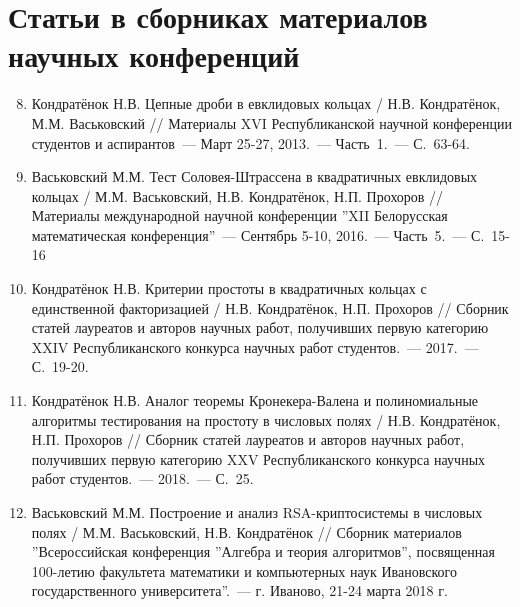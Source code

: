\vspace{-4ex}
\section*{\fontsize{14}{15}\selectfont Статьи в сборниках материалов научных конференций}
\vspace{-4ex}

\begin{enumerate}
\setcounter{enumi}{7}

    \item \label{source:Republican_Scientific_Conference_of_Students_and_Postgraduates_2013}
    Кондратёнок Н.В. Цепные дроби в евклидовых кольцах / Н.В. Кондратёнок, М.М. Васьковский // Материалы XVI Республиканской научной конференции студентов и аспирантов~--- Март 25-27, 2013.~--- Часть~1.~--- С.~63-64.

    \item \label{source:XII_Belarussian_math_conference_2016}
    Васьковский М.М. Тест Соловея-Штрассена в квадратичных евклидовых кольцах / М.М. Васьковский, Н.В. Кондратёнок, Н.П. Прохоров // Материалы международной научной конференции ''XII Белорусская математическая конференция''~--- Сентябрь 5-10, 2016.~--- Часть~5.~--- С.~15-16

    \item \label{source:Collection_of_articles_by_laureates_2017}
    Кондратёнок Н.В. Критерии простоты в квадратичных кольцах с единственной факторизацией / Н.В. Кондратёнок, Н.П. Прохоров // Сборник статей лауреатов и авторов научных работ, получивших первую категорию XXIV Республиканского конкурса научных работ студентов.~--- 2017.~--- С.~19-20.

    \item \label{source:Collection_of_articles_by_laureates_2018}
    Кондратёнок Н.В. Аналог теоремы Кронекера-Валена и полиномиальные алгоритмы тестирования на простоту в числовых полях / Н.В. Кондратёнок, Н.П. Прохоров // Сборник статей лауреатов и авторов научных работ, получивших первую категорию XXV Республиканского конкурса научных работ студентов.~--- 2018.~--- С.~25.

    \item \label{source:Algebra_and_theory_of_algorithms}
    Васьковский М.М. Построение и анализ RSA-криптосистемы в числовых полях / М.М. Васьковский, Н.В. Кондратёнок // Сборник материалов ''Всероссийская конференция ''Алгебра и теория алгоритмов'', посвященная 100-летию факультета математики и компьютерных наук Ивановского государственного университета''.~--- г. Иваново, 21-24 марта 2018 г.


\end{enumerate}
